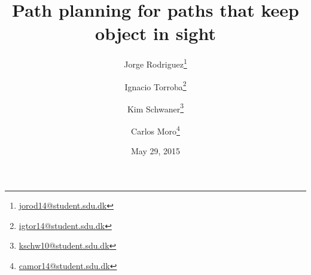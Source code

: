 
\title{Path planning for paths that keep object in sight}
\date{May 29, 2015}
\author{Jorge Rodriguez\thanks{\href{mailto:jorod14@student.sdu.dk}{jorod14@student.sdu.dk}}}
\author{Ignacio Torroba\thanks{\href{mailto:igtor14@student.sdu.dk}{igtor14@student.sdu.dk}}}
\author{Kim Schwaner\thanks{\href{mailto:kschw10@student.sdu.dk}{kschw10@student.sdu.dk}}}
\author{Carlos Moro\thanks{\href{mailto:camor14@student.sdu.dk}{camor14@student.sdu.dk}}}
